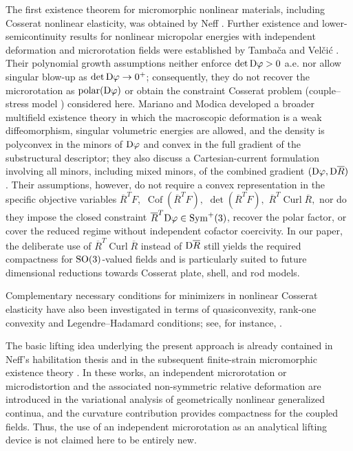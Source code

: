 \documentclass[11pt]{article}
\begin{document}
The first existence theorem for micromorphic nonlinear materials, including Cosserat nonlinear elasticity, was obtained by Neff \cite{Neff_Habil04,NeffMicromorphic2006}. Further existence and lower-semicontinuity results for nonlinear micropolar energies with independent deformation and microrotation fields were established by Tamba\v{c}a and Vel\v{c}i\'c \cite{TambacaVelcicExistence2010,TambacaVelcicSemicontinuity2010}. Their polynomial growth assumptions neither enforce $\det{\rm D}\varphi>0$ a.e. nor allow singular blow-up as $\det{\rm D}\varphi\to0^+$; consequently, they do not recover the microrotation as $\operatorname{polar}({\rm D}\varphi)$ or obtain the constraint Cosserat problem (couple--stress model \cite{Toupin62,sky2026cosserat}) considered here. Mariano and Modica developed a broader multifield existence theory in which the macroscopic deformation is a weak diffeomorphism, singular volumetric energies are allowed, and the density is polyconvex in the minors of ${\rm D}\varphi$ and convex in the full gradient of the substructural descriptor; they also discuss a Cartesian-current formulation involving all minors, including mixed minors, of the combined gradient $({\rm D}\varphi,{\rm D} \overline R)$ \cite{Mariano08a}. Their assumptions, however, do not require a convex representation in the specific objective variables
$
 \overline R^{T}F,$ $ \operatorname{Cof}( \overline R^{T}F),$ $
\det ( \overline R^{T}F),$ $ \overline R^{T}\operatorname{Curl} \overline R,
$
nor do they impose the closed constraint $ \overline R^{T}{\rm D}\varphi\in\operatorname{Sym}^{+}(3)$, recover the polar factor, or cover the reduced regime without independent cofactor coercivity. In our paper, the deliberate use of $\overline R^{T}\operatorname{Curl} \overline R$ instead of ${\rm D} \overline R$ still yields the required compactness for ${\rm SO}(3)$-valued fields and is particularly suited to future dimensional reductions towards Cosserat plate, shell, and rod models.
 
Complementary necessary conditions for minimizers in nonlinear Cosserat elasticity have also been investigated in terms of quasiconvexity, rank-one convexity and Legendre--Hadamard conditions; see, for instance, \cite{ShiraniSteigmann2022,Birsan2025Quasiconvexity}. 


The basic lifting idea underlying the present approach is already contained
in Neff's habilitation thesis and in the subsequent finite-strain
micromorphic existence theory
\cite{Neff_Habil04,NeffMicromorphic2006}.  In these works, an independent microrotation or microdistortion and the
associated non-symmetric relative deformation are introduced in the
variational analysis of geometrically nonlinear generalized continua, and
the curvature contribution provides compactness for the coupled fields.
Thus, the use of an independent microrotation as an analytical lifting
device is not claimed here to be entirely new.
\end{document}
